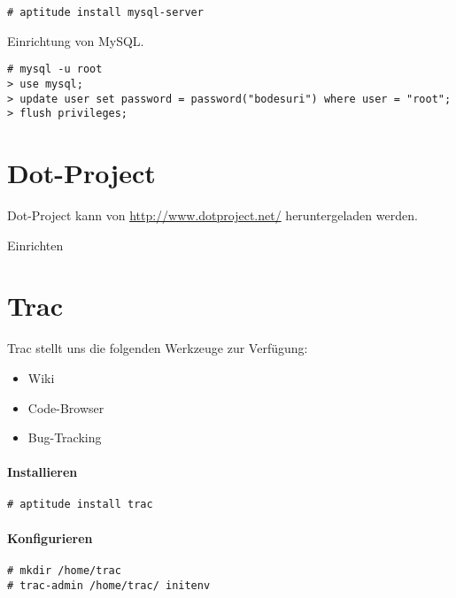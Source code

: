 \documentclass[a4paper,12pt,halfparskip,DIV14]{scrreprt}
\begin{document}
\begin{verbatim}
# aptitude install mysql-server
\end{verbatim}

Einrichtung von MySQL.

\begin{verbatim}
# mysql -u root
> use mysql;
> update user set password = password("bodesuri") where user = "root";
> flush privileges;
\end{verbatim}


\section{Dot-Project} %
\label{sec:dot_project}

Dot-Project kann von \url{http://www.dotproject.net/} heruntergeladen werden.

Einrichten 




\section{Trac}

Trac stellt uns die folgenden Werkzeuge zur Verfügung:

\begin{itemize}
	\item Wiki
	\item Code-Browser
	\item Bug-Tracking
\end{itemize}

\paragraph{Installieren}

\begin{verbatim}
# aptitude install trac
\end{verbatim}

\paragraph{Konfigurieren}

\begin{verbatim}
# mkdir /home/trac
# trac-admin /home/trac/ initenv
\end{verbatim}
\end{document}
